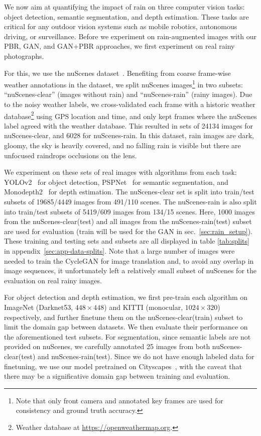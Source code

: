 We now aim at quantifying the impact of rain on three computer vision tasks: object detection, semantic segmentation, and depth estimation. These tasks are critical for any outdoor vision systems such as mobile robotics, autonomous driving, or surveillance. Before we experiment on rain-augmented images with our PBR, GAN, and GAN+PBR approaches, we first experiment on real rainy photographs. 

For this, we use the nuScenes dataset~\cite{caesar2019nuscenes}. Benefiting from coarse frame-wise weather annotations in the dataset, we split nuScenes images\footnote{Note that only front camera and annotated key frames are used for consistency and ground truth accuracy.} in two subsets: ``nuScenes-clear'' (images without rain) and ``nuScenes-rain'' (rainy images). Due to the noisy weather labels, we cross-validated each frame with a historic weather database\footnote{Weather database at \url{https://openweathermap.org}.} using GPS location and time, and only kept frames where the nuScenes label agreed with the weather database. This resulted in sets of 24134 images for nuScenes-clear, and 6028 for nuScenes-rain. In this dataset, rain images are dark, gloomy, the sky is heavily covered, and no falling rain is visible but there are unfocused raindrops occlusions on the lens.

We experiment on these sets of real images with algorithms from each task: YOLOv2~\cite{redmon2017yolo9000} for object detection, PSPNet~\cite{zhao2017pspnet} for semantic segmentation, and Monodepth2~\cite{godard2019digging} for depth estimation. The nuScenes-clear set is split into train/test subsets of 19685/4449 images from 491/110 scenes. The nuScenes-rain is also split into train/test subsets of 5419/609 images from 134/15 scenes. Here, 1000 images from the nuScenes-clear(test) and all images from the nuScenes-rain(test) subset are used for evaluation (train will be used for the GAN in sec.~\ref{sec:rain_setup}). These training and testing sets and subsets are all displayed in table \ref{tab:splits} in appendix~\ref{sec:app-data-splits}. Note that a large number of images were needed to train the CycleGAN for image translation and, to avoid any overlap in image sequences, it unfortunately left a relatively small subset of nuScenes for the evaluation on real rainy images.

For object detection and depth estimation, we first pre-train each algorithm on ImageNet (Darknet53, $448\times448$) and KITTI (monocular, $1024\times320$) respectively, and further finetune them on the nuScenes-clear(train) subset to limit the domain gap between datasets. We then evaluate their performance on the aforementioned test subsets. For segmentation, since semantic labels are not provided on nuScenes, we carefully annotated 25 images from both nuScenes-clear(test) and nuScenes-rain(test). Since we do not have enough labeled data for finetuning, we use our model pretrained on Cityscapes~\cite{Cordts2016Cityscapes}, with the caveat that there may be a significative domain gap between training and evaluation. 

